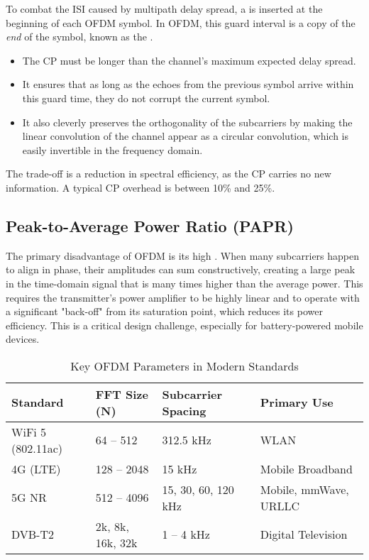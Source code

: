 To combat the ISI caused by multipath delay spread, a  is inserted at the beginning of each OFDM symbol. In OFDM, this guard interval is a copy of the \emph{end} of the symbol, known as the .
\begin{itemize}
    \item The CP must be longer than the channel's maximum expected delay spread.
    \item It ensures that as long as the echoes from the previous symbol arrive within this guard time, they do not corrupt the current symbol.
    \item It also cleverly preserves the orthogonality of the subcarriers by making the linear convolution of the channel appear as a circular convolution, which is easily invertible in the frequency domain.
\end{itemize}
The trade-off is a reduction in spectral efficiency, as the CP carries no new information. A typical CP overhead is between 10\% and 25\%.


\subsection{Peak-to-Average Power Ratio (PAPR)}

The primary disadvantage of OFDM is its high . When many subcarriers happen to align in phase, their amplitudes can sum constructively, creating a large peak in the time-domain signal that is many times higher than the average power. This requires the transmitter's power amplifier to be highly linear and to operate with a significant "back-off" from its saturation point, which reduces its power efficiency. This is a critical design challenge, especially for battery-powered mobile devices.


\begin{table}[H]
    \centering
    \caption{Key OFDM Parameters in Modern Standards}
    \label{tab:ofdm-standards}
    \begin{tabularx}{\textwidth}{@{}lXXX@{}}
        \toprule
        \tableheaderfont Standard & \tableheaderfont FFT Size (N) & \tableheaderfont Subcarrier Spacing & \tableheaderfont Primary Use \\
        \midrule
        WiFi 5 (802.11ac) & 64 -- 512 & 312.5 kHz & WLAN \\
        4G (LTE) & 128 -- 2048 & 15 kHz & Mobile Broadband \\
        5G NR & 512 -- 4096 & 15, 30, 60, 120 kHz & Mobile, mmWave, URLLC \\
        DVB-T2 & 2k, 8k, 16k, 32k & 1 -- 4 kHz & Digital Television \\
        \bottomrule
    \end{tabularx}
\end{table}


